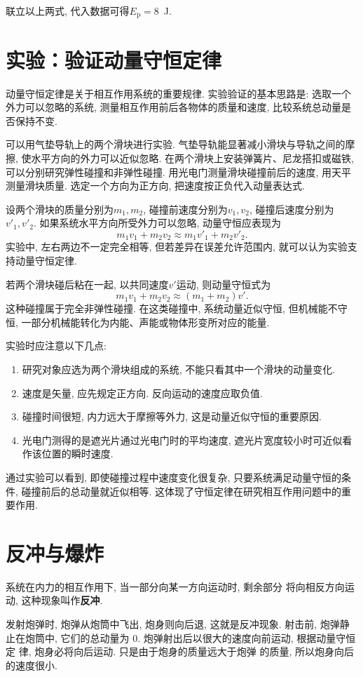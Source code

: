 \documentclass[11pt,a4paper]{ctexbook}
\begin{document}
联立以上两式, 代入数据可得$E_\mathrm{p} = 8$\ J.


\section{实验：验证动量守恒定律}

动量守恒定律是关于相互作用系统的重要规律. 实验验证的基本思路是: 选取一个外力可以忽略的系统,
测量相互作用前后各物体的质量和速度, 比较系统总动量是否保持不变.

可以用气垫导轨上的两个滑块进行实验. 气垫导轨能显著减小滑块与导轨之间的摩擦, 使水平方向的外力可以近似忽略.
在两个滑块上安装弹簧片、尼龙搭扣或磁铁, 可以分别研究弹性碰撞和非弹性碰撞. 用光电门测量滑块碰撞前后的速度,
用天平测量滑块质量. 选定一个方向为正方向, 把速度按正负代入动量表达式.

设两个滑块的质量分别为$m_1,m_2$, 碰撞前速度分别为$v_1,v_2$, 碰撞后速度分别为$v'_1,v'_2$.
如果系统水平方向所受外力可以忽略, 动量守恒应表现为
$$m_1v_1+m_2v_2\approx m_1v'_1+m_2v'_2.$$
实验中, 左右两边不一定完全相等, 但若差异在误差允许范围内, 就可以认为实验支持动量守恒定律.

若两个滑块碰后粘在一起, 以共同速度$v'$运动, 则动量守恒式为
$$m_1v_1+m_2v_2\approx (m_1+m_2)v'.$$
这种碰撞属于完全非弹性碰撞. 在这类碰撞中, 系统动量近似守恒, 但机械能不守恒,
一部分机械能转化为内能、声能或物体形变所对应的能量.

实验时应注意以下几点:
\begin{enumerate}
    \item 研究对象应选为两个滑块组成的系统, 不能只看其中一个滑块的动量变化.
    \item 速度是矢量, 应先规定正方向. 反向运动的速度应取负值.
    \item 碰撞时间很短, 内力远大于摩擦等外力, 这是动量近似守恒的重要原因.
    \item 光电门测得的是遮光片通过光电门时的平均速度, 遮光片宽度较小时可近似看作该位置的瞬时速度.
\end{enumerate}

通过实验可以看到, 即使碰撞过程中速度变化很复杂, 只要系统满足动量守恒的条件,
碰撞前后的总动量就近似相等. 这体现了守恒定律在研究相互作用问题中的重要作用.

\section{反冲与爆炸}
系统在内力的相互作用下, 当一部分向某一方向运动时, 剩余部分
将向相反方向运动, 这种现象叫作\textbf{反冲}.

发射炮弹时, 炮弹从炮筒中飞出, 炮身则向后退,
这就是反冲现象. 射击前, 炮弹静止在炮筒中, 它们的总动量为
0. 炮弹射出后以很大的速度向前运动, 根据动量守恒定
律, 炮身必将向后运动. 只是由于炮身的质量远大于炮弹
的质量, 所以炮身向后的速度很小.
\end{document}
